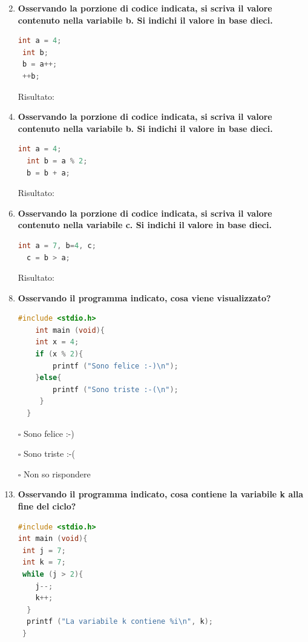 \documentclass[11pt]{article}
\begin{document}
\begin{enumerate}
\item [\nonumber]
 \item {\bf Osservando la porzione di codice indicata, si scriva il valore contenuto nella variabile b. Si indichi il valore in base dieci.}
 
 \begin{lstlisting}[language=c]
 int a = 4;
 int b; 
 b = a++;
 ++b;
 \end{lstlisting}
 Risultato: 
 \item [\nonumber]
 \item{\bf Osservando la porzione di codice indicata, si scriva il valore contenuto nella variabile b. Si indichi il valore in base dieci.}
 
  \begin{lstlisting}[language=c]
  int a = 4;
  int b = a % 2;
  b = b + a;
 \end{lstlisting}
  Risultato: 
  \item [\nonumber]
  \item {\bf Osservando la porzione di codice indicata, si scriva il valore contenuto nella variabile c. Si indichi il valore in base dieci.}
 
  \begin{lstlisting}[language=c]
  int a = 7, b=4, c;
  c = b > a;
   \end{lstlisting}
  Risultato: 
  \item [\nonumber]
  \item {\bf Osservando il programma indicato, cosa viene visualizzato?}
  
  \begin{lstlisting}[language=c]
   #include <stdio.h>
    int main (void){
    int x = 4;
    if (x % 2){
    	printf ("Sono felice :-)\n");
    }else{
    	printf ("Sono triste :-(\n");
     }
  }
 \end{lstlisting}   
 
\item[$\square$] Sono felice :-)
\item[$\square$] Sono triste :-(
\item[$\square$] Non so rispondere
\item [\nonumber]
\item {\bf Osservando il programma indicato, cosa contiene la variabile k alla fine del ciclo?}

 \begin{lstlisting}[language=c]
#include <stdio.h>
int main (void){
 int j = 7;
 int k = 7; 
 while (j > 2){
  	j--;
   	k++;
  }
  printf ("La variabile k contiene %i\n", k);
 }
\end{lstlisting}   


\end{enumerate}
\end{document}

